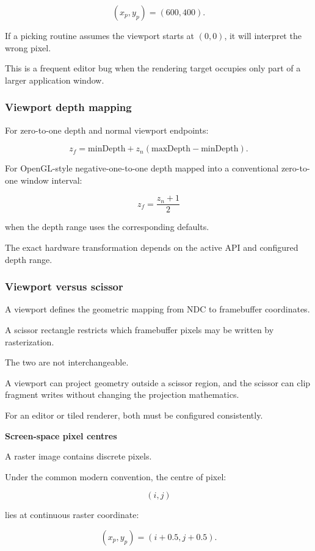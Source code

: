 \[
 \boxed{(x_p,y_p)=(600,400)}.
\]

If a picking routine assumes the viewport starts at \((0,0)\), it will interpret the wrong pixel.

This is a frequent editor bug when the rendering target occupies only part of a larger application window.

\subsubsection{Viewport depth mapping}\label{viewport-depth-mapping}

For zero-to-one depth and normal viewport endpoints:

\[
 \boxed{ z_f=\mathrm{minDepth} + z_n(\mathrm{maxDepth}-\mathrm{minDepth}) }.
\]

For OpenGL-style negative-one-to-one depth mapped into a conventional zero-to-one window interval:

\[
 \boxed{ z_f=\frac{z_n+1}{2} }
\]

when the depth range uses the corresponding defaults.

The exact hardware transformation depends on the active API and configured depth range.

\subsubsection{Viewport versus scissor}\label{viewport-versus-scissor}

A viewport defines the geometric mapping from NDC to framebuffer coordinates.

A scissor rectangle restricts which framebuffer pixels may be written by rasterization.

The two are not interchangeable.

A viewport can project geometry outside a scissor region, and the scissor can clip fragment writes without changing the projection mathematics.

For an editor or tiled renderer, both must be configured consistently.

\textbf{Screen-space pixel centres}

A raster image contains discrete pixels.

Under the common modern convention, the centre of pixel:

\[
 (i,j)
\]

lies at continuous raster coordinate:

\[
 \boxed{ (x_p,y_p)=(i+0.5,j+0.5) }.
\]

